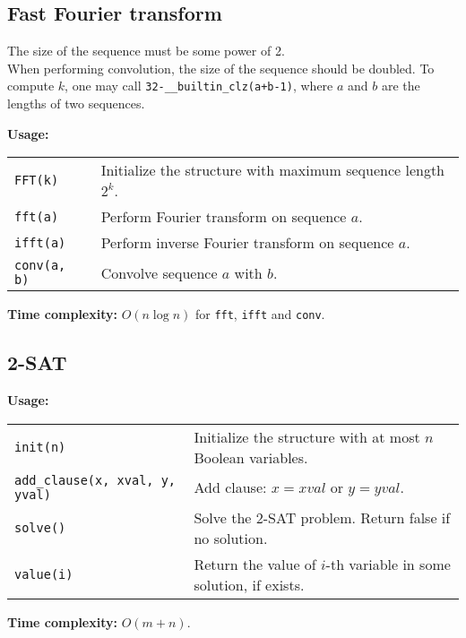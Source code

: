 \subsection{Fast Fourier transform}
\Warning The size of the sequence must be some power of 2. \\
\Warning When performing convolution, the size of the sequence should be doubled. To compute $k$, one may call \lstinline|32-__builtin_clz(a+b-1)|, where $a$ and $b$ are the lengths of two sequences.  \par
\textbf{Usage:} \\[0.1cm]
\begin{tabular}{p{2cm} p{9.5cm}}
  \lstinline|FFT(k)| & Initialize the structure with maximum sequence length $2^k$. \\
  \lstinline|fft(a)| & Perform Fourier transform on sequence $a$.  \\
  \lstinline|ifft(a)| & Perform inverse Fourier transform on sequence $a$. \\
  \lstinline|conv(a, b)| & Convolve sequence $a$ with $b$. \\
\end{tabular} \par
\textbf{Time complexity:} $O(n \log n)$ for \lstinline|fft|, \lstinline|ifft| and \lstinline|conv|. \par


\subsection{2-SAT}
\textbf{Usage:} \\[0.1cm]
\begin{tabular}{p{2.5cm} p{9cm}}
  \lstinline|init(n)| & Initialize the structure with at most $n$ Boolean variables. \\
  \lstinline|add_clause(x, xval, y, yval)| & Add clause: $x = xval$ or $y = yval$.  \\
  \lstinline|solve()| & Solve the 2-SAT problem. Return false if no solution. \\
  \lstinline|value(i)| & Return the value of $i$-th variable in some solution, if exists. \\
\end{tabular} \par
\textbf{Time complexity:} $O(m+n)$. \par


